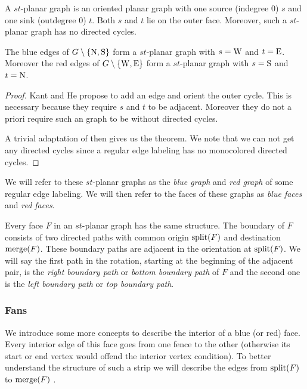     A $st$-planar graph is an oriented planar graph with one source (indegree 0) $s$ and one sink (outdegree 0) $t$. Both $s$ and $t$ lie on the outer face. Moreover, such a $st$-planar graph has no directed cycles.

    \begin{thrm}
      \label{th:rel:stPlanarGraphs}
      The blue edges of $G\setminus \left\lbrace {\mathrm{N},\mathrm{S}} \right\rbrace$ form a $st$-planar graph with $s= \mathrm{W}$ and $t=\mathrm{E}$. Moreover the red edges of $G\setminus \left\lbrace {\mathrm{W},\mathrm{E}} \right\rbrace$ form a $st$-planar graph with $s= \mathrm{S}$ and $t= \mathrm{N}$.
    \end{thrm}
    \begin{proof}
      Kant and He propose to add an edge and orient the outer cycle. This is necessary because they require $s$ and $t$ to be adjacent. Moreover they do not a priori require such an graph to be without directed cycles.

      A trivial adaptation of \cite[pp.179]{Kant1997} then gives us the theorem. We note that we can not get any directed cycles since a regular edge labeling has no monocolored directed cycles.
    \end{proof}

    We will refer to these $st$-planar graphs as the \emph{blue graph} and \emph{red graph} of some regular edge labeling. We will then refer to the faces of these graphs as \emph{blue faces} and \emph{red faces}.

    Every face $F$ in an $st$-planar graph has the same structure. The boundary of $F$ consists of two directed paths with common origin $\operatorname{split}(F)$ and  destination $\operatorname{merge}(F)$.
    These boundary paths are adjacent in the orientation at $\operatorname{split}(F)$. We will say the first path in the rotation, starting at the beginning of the adjacent pair, is the \emph{right boundary path} or \emph{bottom boundary path} of $F$ and the second one is the \emph{left boundary path} or \emph{top boundary path}.

    \subsubsection{Fans}
    We introduce some more concepts to describe the interior of a blue (or red) face. Every interior edge of this face goes from one fence to the other (otherwise its start or end vertex would offend the interior vertex condition). To better understand the structure of such a strip we will describe the edges from $\operatorname{split}(F)$ to $\operatorname{merge}(F)$ .


